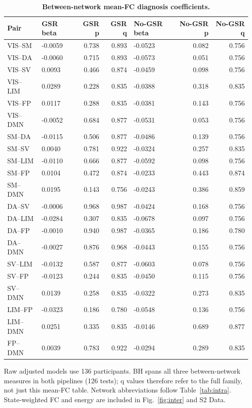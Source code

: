 \begin{table}[H]
\centering\small
\caption{\textbf{Between-network mean-FC diagnosis coefficients.}}\label{tab:inter}
\begin{tabular}{llrrlrr}
\toprule
Pair & GSR beta & GSR p & GSR q & No-GSR beta & No-GSR p & No-GSR q \\
\midrule
VIS--SM & -0.0059 & 0.738 & 0.893 & -0.0523 & 0.082 & 0.756 \\
VIS--DA & -0.0060 & 0.715 & 0.893 & -0.0573 & 0.051 & 0.756 \\
VIS--SV & 0.0093 & 0.466 & 0.874 & -0.0459 & 0.098 & 0.756 \\
VIS--LIM & 0.0289 & 0.228 & 0.835 & -0.0388 & 0.318 & 0.835 \\
VIS--FP & 0.0117 & 0.288 & 0.835 & -0.0381 & 0.143 & 0.756 \\
VIS--DMN & -0.0052 & 0.684 & 0.877 & -0.0531 & 0.053 & 0.756 \\
SM--DA & -0.0115 & 0.506 & 0.877 & -0.0486 & 0.139 & 0.756 \\
SM--SV & 0.0040 & 0.781 & 0.922 & -0.0324 & 0.257 & 0.835 \\
SM--LIM & -0.0110 & 0.666 & 0.877 & -0.0592 & 0.098 & 0.756 \\
SM--FP & 0.0104 & 0.472 & 0.874 & -0.0233 & 0.443 & 0.874 \\
SM--DMN & 0.0195 & 0.143 & 0.756 & -0.0243 & 0.386 & 0.859 \\
DA--SV & -0.0006 & 0.968 & 0.987 & -0.0424 & 0.168 & 0.756 \\
DA--LIM & -0.0284 & 0.307 & 0.835 & -0.0678 & 0.097 & 0.756 \\
DA--FP & -0.0010 & 0.940 & 0.987 & -0.0365 & 0.186 & 0.780 \\
DA--DMN & -0.0027 & 0.876 & 0.968 & -0.0443 & 0.155 & 0.756 \\
SV--LIM & -0.0132 & 0.587 & 0.877 & -0.0603 & 0.078 & 0.756 \\
SV--FP & -0.0123 & 0.244 & 0.835 & -0.0450 & 0.115 & 0.756 \\
SV--DMN & 0.0139 & 0.258 & 0.835 & -0.0322 & 0.273 & 0.835 \\
LIM--FP & -0.0323 & 0.186 & 0.780 & -0.0548 & 0.136 & 0.756 \\
LIM--DMN & 0.0251 & 0.335 & 0.835 & -0.0146 & 0.689 & 0.877 \\
FP--DMN & 0.0039 & 0.783 & 0.922 & -0.0294 & 0.289 & 0.835 \\
\bottomrule
\end{tabular}
\begin{flushleft}\footnotesize
Raw adjusted models use 136 participants. BH spans all three between-network measures in both pipelines (126 tests); q values therefore refer to the full family, not just this mean-FC table. Network abbreviations follow Table~\ref{tab:intra}. State-weighted FC and energy are included in Fig.~\ref{fig:inter} and S2 Data.
\end{flushleft}
\end{table}
